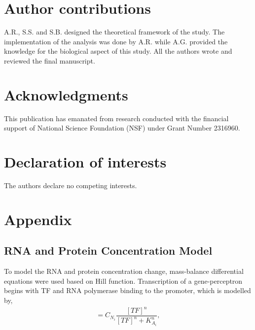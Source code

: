 \documentclass[twocolumn]{biophys-new}
\begin{document}
{{%
%




\section*{Author contributions}
A.R., S.S. and S.B. designed the theoretical framework of the study. The implementation of the analysis was done by A.R. while A.G.  provided the knowledge for the biological aspect of this study. All the authors wrote and reviewed the final manuscript.

\section*{Acknowledgments}
This publication has emanated from research conducted with the financial support of National Science Foundation (NSF) under Grant Number 2316960.

\section*{Declaration of interests}
The authors declare no competing interests.

\section*{Appendix} 
\subsection*{RNA and Protein Concentration Model  } \label{append_A}
To model the RNA and protein concentration change, mass-balance differential equations were used based on Hill function.  
Transcription of a gene-perceptron begins with TF and RNA polymerase binding to the promoter,
which is modelled by,
\begin{gather}
    [Prom.TF] = C_{N_i} \dfrac{[TF]^n}{[TF]^n + K_{A_i}^n}, \label{eq: prmoter_TF_activate}
\end{gather}

}}
\end{document}
